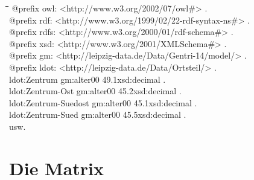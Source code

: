 \documentclass[a4paper,11pt]{article}
\newenvironment{code}{\tt \begin{tabbing}
\hskip12pt\=\hskip12pt\=\hskip12pt\=\hskip12pt\=\hskip5cm\=\hskip5cm\=\kill}
{\end{tabbing}}
\def\ppw{{\char94\char94}}
\begin{document}
\begin{code}
@prefix owl:  <http://www.w3.org/2002/07/owl\#> .\\
@prefix rdf:  <http://www.w3.org/1999/02/22-rdf-syntax-ns\#> .\\
@prefix rdfs: <http://www.w3.org/2000/01/rdf-schema\#> .\\
@prefix xsd:  <http://www.w3.org/2001/XMLSchema\#> .\\
@prefix gm:   <http://leipzig-data.de/Data/Gentri-14/model/> .\\
@prefix ldot: <http://leipzig-data.de/Data/Ortsteil/> .\\[6pt]

ldot:Zentrum gm:alter00 {\dq}49.1{\dq}{\ppw}xsd:decimal .\\
ldot:Zentrum-Ost gm:alter00 {\dq}45.2{\dq}{\ppw}xsd:decimal .\\
ldot:Zentrum-Suedost gm:alter00 {\dq}45.1{\dq}{\ppw}xsd:decimal .\\
ldot:Zentrum-Sued gm:alter00 {\dq}45.5{\dq}{\ppw}xsd:decimal .\\
usw.
\end{code}

\section{Die Matrix} \label{matrix}
\end{document}
